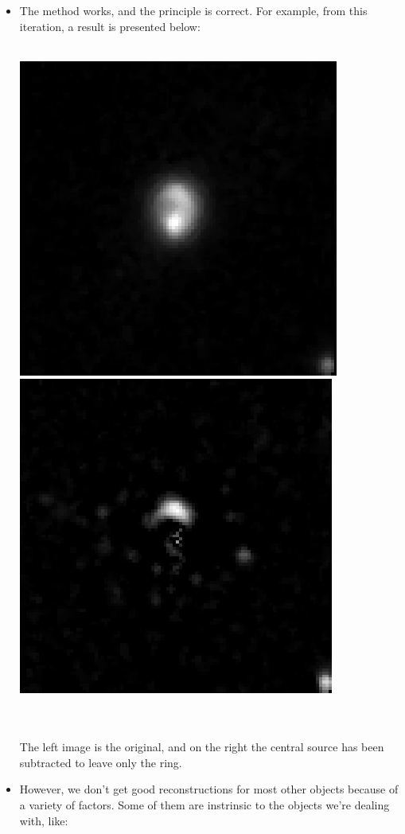 \documentclass[11pt, a4paper]{article}
\begin{document}
\begin{itemize}
\item The method works, and the principle is correct. For example, from this iteration, a result is presented below: \\ \\
\centerline{\includegraphics[scale=0.5]{first_object.png} \includegraphics[scale=0.5]{first_ring.png}}
\\ \\ The left image is the original, and on the right the central source has been subtracted to leave only the ring.
\item However, we don't get good reconstructions for most other objects because of a variety of factors. Some of them are instrinsic to the objects we're dealing with, like:

\end{itemize}
\end{document}
